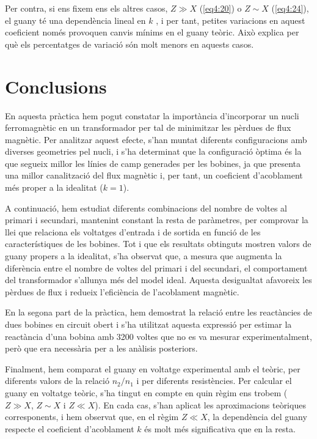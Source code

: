 \documentclass[a4paper,10.5pt]{report}
\begin{document}
Per contra, si ens fixem ens els altres casos, $Z \gg X$ (\ref{eq4:20}) o $Z \sim X$ (\ref{eq4:24}), el guany té una dependència lineal en $k$ , i per tant, petites variacions en aquest coeficient només provoquen canvis mínims en el guany teòric. Això explica per què els percentatges de variació són molt menors en aquests casos.



\section{Conclusions}
En aquesta pràctica hem pogut constatar la importància d'incorporar un nucli ferromagnètic en un transformador per tal de minimitzar les pèrdues de flux magnètic. Per analitzar aquest efecte, s’han muntat diferents configuracions amb diverses geometries pel nucli, i s’ha determinat que la configuració òptima és la que segueix millor les línies de camp generades per les bobines, ja que presenta una millor canalització del flux magnètic i, per tant, un coeficient d’acoblament més proper a la idealitat ($k = 1$).

A continuació, hem estudiat diferents combinacions del nombre de voltes al primari i secundari, mantenint constant la resta de paràmetres, per comprovar la llei que relaciona els voltatges d'entrada i de sortida en funció de les característiques de les bobines. Tot i que els resultats obtinguts mostren valors de guany propers a la idealitat, s’ha observat que, a mesura que augmenta la diferència entre el nombre de voltes del primari i del secundari, el comportament del transformador s’allunya més del model ideal. Aquesta desigualtat afavoreix les pèrdues de flux i redueix l’eficiència de l’acoblament magnètic.

En la segona part de la pràctica, hem demostrat la relació entre les reactàncies de dues bobines en circuit obert i s’ha utilitzat aquesta expressió per estimar la reactància d’una bobina amb 3200 voltes que no es va mesurar experimentalment, però que era necessària per a les anàlisis posteriors.

Finalment, hem comparat el guany en voltatge experimental amb el teòric, per diferents valors de la relació $n_2/n_1$ i per diferents resistències. Per calcular el guany en voltatge teòric, s'ha tingut en compte en quin règim ens trobem ($Z \gg X$, $Z \sim X$ i $Z \ll X$). En cada cas, s’han aplicat les aproximacions teòriques corresponents, i hem observat que, en el règim $Z \ll X$, la dependència del guany respecte el coeficient d’acoblament $k$ és molt més significativa que en la resta.
\end{document}
